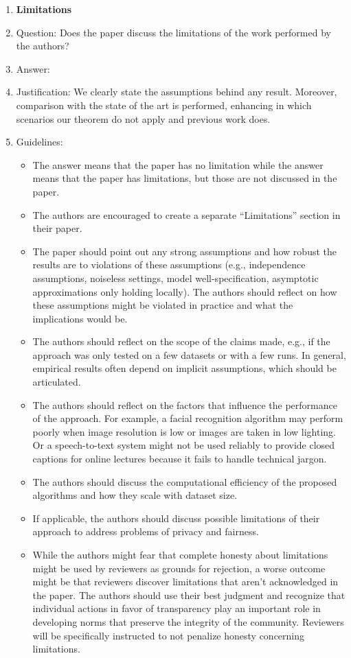 \documentclass{article}
\numberwithin{theorem}{section}
\theoremstyle{definition}
\begin{document}
\begin{enumerate}
\item {\bf Limitations}
    \item[] Question: Does the paper discuss the limitations of the work performed by the authors?
    \item[] Answer: \answerYes{} %
    \item[] Justification: We clearly state the assumptions behind any result. Moreover, comparison with the state of the art is performed, enhancing in which scenarios our theorem do not apply and previous work does.
    \item[] Guidelines:
    \begin{itemize}
        \item The answer \answerNA{} means that the paper has no limitation while the answer \answerNo{} means that the paper has limitations, but those are not discussed in the paper. 
        \item The authors are encouraged to create a separate ``Limitations'' section in their paper.
        \item The paper should point out any strong assumptions and how robust the results are to violations of these assumptions (e.g., independence assumptions, noiseless settings, model well-specification, asymptotic approximations only holding locally). The authors should reflect on how these assumptions might be violated in practice and what the implications would be.
        \item The authors should reflect on the scope of the claims made, e.g., if the approach was only tested on a few datasets or with a few runs. In general, empirical results often depend on implicit assumptions, which should be articulated.
        \item The authors should reflect on the factors that influence the performance of the approach. For example, a facial recognition algorithm may perform poorly when image resolution is low or images are taken in low lighting. Or a speech-to-text system might not be used reliably to provide closed captions for online lectures because it fails to handle technical jargon.
        \item The authors should discuss the computational efficiency of the proposed algorithms and how they scale with dataset size.
        \item If applicable, the authors should discuss possible limitations of their approach to address problems of privacy and fairness.
        \item While the authors might fear that complete honesty about limitations might be used by reviewers as grounds for rejection, a worse outcome might be that reviewers discover limitations that aren't acknowledged in the paper. The authors should use their best judgment and recognize that individual actions in favor of transparency play an important role in developing norms that preserve the integrity of the community. Reviewers will be specifically instructed to not penalize honesty concerning limitations.
    \end{itemize}


\end{enumerate}
\end{document}
